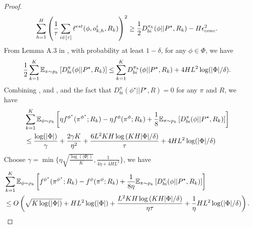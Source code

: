 \begin{proof}
\begin{align}
     \sum_{h=1}^H \left(\frac{1}{\tau} \sum_{i \in [\tau]}\ell^{est}(\phi, o_{k,h}^i, R_k)\right)^2 \ge \frac{1}{2}D_{bi}^{\pi_k}(\phi||P^\star, R_k) -H\epsilon_{conc}^2. 
     \label{eq:conc2}
\end{align}
From Lemma A.3 in \cite{foster2021statistical}, with probability at least $1-\delta$, for any $\phi \in \Phi$, we have
\begin{align*}
   \frac{1}{2}\sum_{k=1}^K \mathbb{E}_{\pi \sim p_k}\left[D_{bi}^{\pi}(\phi||P^\star, R_k)\right] \le   \sum_{k=1}^K D_{bi}^{\pi_k}(\phi||P^\star, R_k) + 4HL^2\log(|\Phi|/\delta). 
\end{align*}
Combining ,  and , and the fact that $D_{bi}^{\pi}(\phi^\star||P^\star, R) = 0$ for any $\pi$ and $R$, we have
\begin{align*}
     &\sum_{k=1}^K \mathbb{E}_{\phi \sim \rho_k}\left[\eta f^{\phi^\star}(\pi^{\phi^\star}; R_k) - \eta f^{\phi}(\pi^{\phi}; R_k) + \frac{1}{8} \mathbb{E}_{\pi \sim p_k}\left[D_{bi}^{\pi}(\phi||P^\star, R_k)\right]\right]  
    \\&\le \frac{\log(|\Phi|)}{\gamma} + \frac{2\gamma K}{\eta^2}  + \frac{6L^2KH\log\left(KH|\Phi|/\delta\right)}{\tau} +  4HL^2\log(|\Phi|/\delta)
\end{align*}
Choose $\gamma = \min\{\eta \sqrt{\frac{\log(|\Phi|)}{K}}, \frac{1}{4\eta + 4HL^2}\}$, we have 
\begin{align}
    &\sum_{k=1}^K \E_{\phi \sim \rho_k}\left[ f^{\phi^\star}(\pi^{\phi^\star}; R_k) - f^{\phi}(\pi^{\phi}; R_k) + \frac{1}{8\eta} \E_{\pi \sim p_k}\left[D_{bi}^{\pi}(\phi||P^\star, R_k)\right]\right]  \nonumber
    \\& \le \order\left(\sqrt{K\log(|\Phi|)} + HL^2\log(|\Phi|) +
 \frac{ L^2KH\log\left(KH|\Phi|/\delta\right)}{\eta\tau} +  \frac{1}{\eta} HL^2\log(|\Phi|/\delta)\right). %
 \label{eq:term1-bound}
\end{align}

\end{proof}
